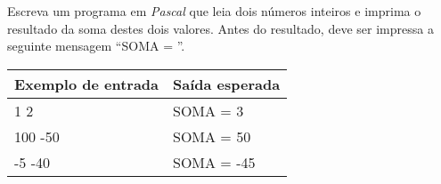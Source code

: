\item Escreva um programa em \emph{Pascal} que leia dois números inteiros e 
imprima o resultado da soma destes dois valores. Antes do resultado, deve ser 
impressa a seguinte mensagem ``SOMA = ''.

\begin{center}
\begin{tabular}{|l|l|} \hline
Exemplo de entrada & Saída esperada \\ \hline
1 2             & SOMA = 3 \\ \hline
100 -50         & SOMA = 50 \\ \hline
-5 -40          & SOMA = -45 \\ \hline
\end{tabular}
\end{center}
    